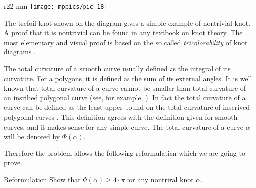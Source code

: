 \begin{wrapfigure}{r}{22 mm}
\vskip-3mm
\centering
\texttt{[image: mppics/pic-18]}
\vskip0mm
\end{wrapfigure}

The trefoil knot shown on the diagram gives a simple example of nontrivial knot.
A proof that it is nontrivial can be found in any textbook on knot theory.
The most elementary and visual proof is based on the so called \emph{tricolorability} of knot diagrams \cite[Section 1.5]{adams}.

The total curvature of a smooth curve usually defined as the integral of its curvature.
For a polygons, it is defined as the sum of its external angles.
It is well known that total curvature of a curve cannot be smaller than total curvature of an insribed polygonal curve (see, for example, \cite{petrunin-zamora}).
In fact the total curvature of a curve can be defined as the least upper bound on the total curvature of inscrived polygonal curves \cite{aleksandrov-reshetnyak, sullivan-curves}.
This definition agrees with the definition given for smooth curves, and it makes sense for any simple curve.
The total curvature of a curve $\alpha$ will be denoted by $\Phi(\alpha)$.

Therefore the problem allows the following reformulation which we are going to prove.

\begin{thm}{Reformulation}\label{thm:fary-milnor}
Show that $\Phi(\alpha)\ge 4\cdot\pi$ for any nontrival knot $\alpha$. 
\end{thm} 


